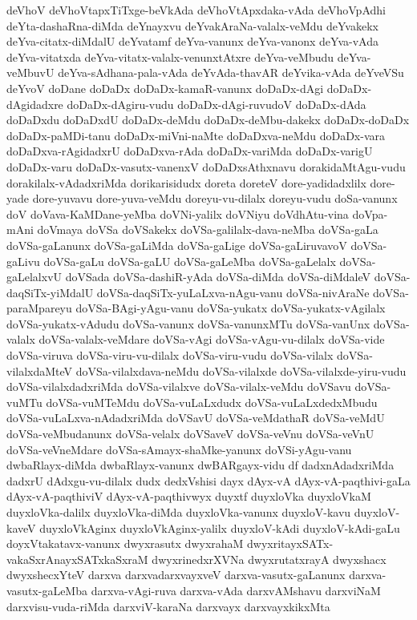 {deVhoV
deVhoVtapxTiTxge-beVkAda
deVhoVtApxdaka-vAda
deVhoVpAdhi
deYta-dashaRna-diMda
deYnayxvu
deYvakAraNa-valalx-veMdu
deYvakekx
deYva-citatx-diMdalU
deYvatamf
deYva-vanunx
deYva-vanonx
deYva-vAda
deYva-vitatxda
deYva-vitatx-valalx-venunxtAtxre
deYva-veMbudu
deYva-veMbuvU
deYva-sAdhana-pala-vAda
deYvAda-thavAR
deYvika-vAda
deYveVSu
deYvoV
doDane
doDaDx
doDaDx-kamaR-vanunx
doDaDx-dAgi
doDaDx-dAgidadxre
doDaDx-dAgiru-vudu
doDaDx-dAgi-ruvudoV
doDaDx-dAda
doDaDxdu
doDaDxdU
doDaDx-deMdu
doDaDx-deMbu-dakekx
doDaDx-doDaDx
doDaDx-paMDi-tanu
doDaDx-miVni-naMte
doDaDxva-neMdu
doDaDx-vara
doDaDxva-rAgidadxrU
doDaDxva-rAda
doDaDx-variMda
doDaDx-varigU
doDaDx-varu
doDaDx-vasutx-vanenxV
doDaDxsAthxnavu
dorakidaMtAgu-vudu
dorakilalx-vAdadxriMda
dorikarisidudx
doreta
doreteV
dore-yadidadxlilx
dore-yade
dore-yuvavu
dore-yuva-veMdu
doreyu-vu-dilalx
doreyu-vudu
doSa-vanunx
doV
doVava-KaMDane-yeMba
doVNi-yalilx
doVNiyu
doVdhAtu-vina
doVpa-mAni
doVmaya
doVSa
doVSakekx
doVSa-galilalx-dava-neMba
doVSa-gaLa
doVSa-gaLanunx
doVSa-gaLiMda
doVSa-gaLige
doVSa-gaLiruvavoV
doVSa-gaLivu
doVSa-gaLu
doVSa-gaLU
doVSa-gaLeMba
doVSa-gaLelalx
doVSa-gaLelalxvU
doVSada
doVSa-dashiR-yAda
doVSa-diMda
doVSa-diMdaleV
doVSa-daqSiTx-yiMdalU
doVSa-daqSiTx-yuLaLxva-nAgu-vanu
doVSa-nivAraNe
doVSa-paraMpareyu
doVSa-BAgi-yAgu-vanu
doVSa-yukatx
doVSa-yukatx-vAgilalx
doVSa-yukatx-vAdudu
doVSa-vanunx
doVSa-vanunxMTu
doVSa-vanUnx
doVSa-valalx
doVSa-valalx-veMdare
doVSa-vAgi
doVSa-vAgu-vu-dilalx
doVSa-vide
doVSa-viruva
doVSa-viru-vu-dilalx
doVSa-viru-vudu
doVSa-vilalx
doVSa-vilalxdaMteV
doVSa-vilalxdava-neMdu
doVSa-vilalxde
doVSa-vilalxde-yiru-vudu
doVSa-vilalxdadxriMda
doVSa-vilalxve
doVSa-vilalx-veMdu
doVSavu
doVSa-vuMTu
doVSa-vuMTeMdu
doVSa-vuLaLxdudx
doVSa-vuLaLxdedxMbudu
doVSa-vuLaLxva-nAdadxriMda
doVSavU
doVSa-veMdathaR
doVSa-veMdU
doVSa-veMbudanunx
doVSa-velalx
doVSaveV
doVSa-veVnu
doVSa-veVnU
doVSa-veVneMdare
doVSa-sAmayx-shaMke-yanunx
doVSi-yAgu-vanu
dwbaRlayx-diMda
dwbaRlayx-vanunx
dwBARgayx-vidu
df
dadxnAdadxriMda
dadxrU
dAdxgu-vu-dilalx
dudx
dedxVshisi
dayx
dAyx-vA
dAyx-vA-paqthivi-gaLa
dAyx-vA-paqthiviV
dAyx-vA-paqthivwyx
duyxtf
duyxloVka
duyxloVkaM
duyxloVka-dalilx
duyxloVka-diMda
duyxloVka-vanunx
duyxloV-kavu
duyxloV-kaveV
duyxloVkAginx
duyxloVkAginx-yalilx
duyxloV-kAdi
duyxloV-kAdi-gaLu
doyxVtakatavx-vanunx
dwyxrasutx
dwyxrahaM
dwyxritayxSATx-vakaSxrAnayxSATxkaSxraM
dwyxrinedxrXVNa
dwyxrutatxrayA
dwyxshacx
dwyxshecxYteV
darxva
darxvadarxvayxveV
darxva-vasutx-gaLanunx
darxva-vasutx-gaLeMba
darxva-vAgi-ruva
darxva-vAda
darxvAMshavu
darxviNaM
darxvisu-vuda-riMda
darxviV-karaNa
darxvayx
darxvayxkikxMta
}
